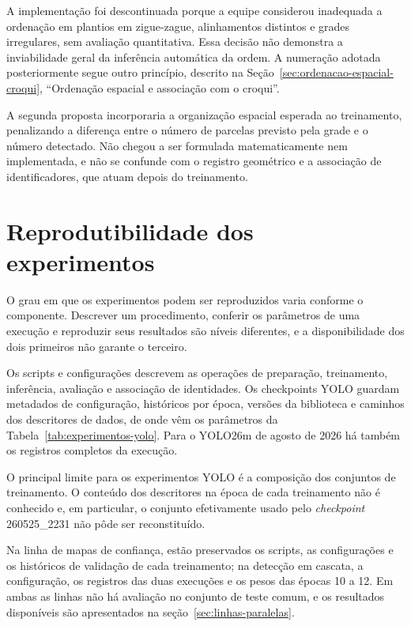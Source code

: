 A implementa\c{c}\~ao foi descontinuada porque a equipe considerou inadequada a ordena\c{c}\~ao em plantios em zigue-zague, alinhamentos distintos e grades irregulares, sem avalia\c{c}\~ao quantitativa. Essa decis\~ao n\~ao demonstra a inviabilidade geral da infer\^encia autom\'atica da ordem. A numera\c{c}\~ao adotada posteriormente segue outro princ\'ipio, descrito na Se\c{c}\~ao~\ref{sec:ordenacao-espacial-croqui}, ``Ordena\c{c}\~ao espacial e associa\c{c}\~ao com o croqui''.

A segunda proposta incorporaria a organiza\c{c}\~ao espacial esperada ao treinamento, penalizando a diferen\c{c}a entre o n\'umero de parcelas previsto pela grade e o n\'umero detectado. N\~ao chegou a ser formulada matematicamente nem implementada, e n\~ao se confunde com o registro geom\'etrico e a associa\c{c}\~ao de identificadores, que atuam depois do treinamento.

\section{Reprodutibilidade dos experimentos}
\label{sec:reprodutibilidade-experimentos}

O grau em que os experimentos podem ser reproduzidos varia conforme o componente. Descrever um procedimento, conferir os par\^ametros de uma execu\c{c}\~ao e reproduzir seus resultados s\~ao n\'iveis diferentes, e a disponibilidade dos dois primeiros n\~ao garante o terceiro.

Os scripts e configura\c{c}\~oes descrevem as opera\c{c}\~oes de prepara\c{c}\~ao, treinamento, infer\^encia, avalia\c{c}\~ao e associa\c{c}\~ao de identidades. Os checkpoints YOLO guardam metadados de configura\c{c}\~ao, hist\'oricos por \'epoca, vers\~oes da biblioteca e caminhos dos descritores de dados, de onde v\^em os par\^ametros da Tabela~\ref{tab:experimentos-yolo}. Para o YOLO26m de agosto de 2026 h\'a tamb\'em os registros completos da execu\c{c}\~ao.

O principal limite para os experimentos YOLO \'e a composi\c{c}\~ao dos conjuntos de treinamento. O conte\'udo dos descritores na \'epoca de cada treinamento n\~ao \'e conhecido e, em particular, o conjunto efetivamente usado pelo \textit{checkpoint} 260525\_2231 n\~ao p\^ode ser reconstitu\'ido.

Na linha de mapas de confian\c{c}a, est\~ao preservados os scripts, as configura\c{c}\~oes e os hist\'oricos de valida\c{c}\~ao de cada treinamento; na detec\c{c}\~ao em cascata, a configura\c{c}\~ao, os registros das duas execu\c{c}\~oes e os pesos das \'epocas 10 a 12. Em ambas as linhas n\~ao h\'a avalia\c{c}\~ao no conjunto de teste comum, e os resultados dispon\'iveis s\~ao apresentados na se\c{c}\~ao~\ref{sec:linhas-paralelas}.

